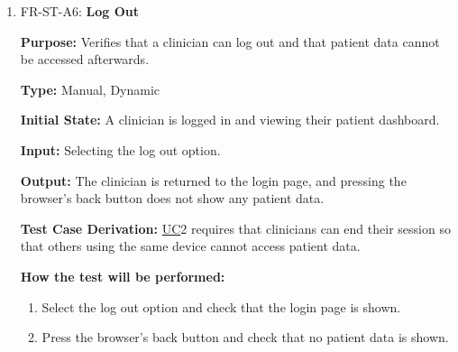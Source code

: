 \documentclass[12pt, titlepage]{article}
\newcommand{\srsuc}[1]{\href{https://github.com/Nour-Fawaz/MacaBoca/blob/main/pdfs/SRS/SRS.pdf}{UC}}
\renewcommand{\_}{\oldunderscore\allowbreak}
\begin{document}
\begin{enumerate}
  \item FR-ST-A6: \textbf{Log Out\\}
  \begin{mdframed}[linewidth=0.5mm]
      \textbf{Purpose:} Verifies that a clinician can log out and that patient data cannot be accessed afterwards. \par
      \textbf{Type:} Manual, Dynamic \par
      \textbf{Initial State:} A clinician is logged in and viewing their patient dashboard. \par
      \textbf{Input:} Selecting the log out option. \par
      \textbf{Output:} The clinician is returned to the login page, and pressing the browser's back button does not show any patient data. \par
      \textbf{Test Case Derivation:} \srsuc*{2} requires that clinicians can end their session so that others using the same device cannot access patient data. \par
      \textbf{How the test will be performed:}
      \begin{enumerate}
          \item[1.] Select the log out option and check that the login page is shown.
          \item[2.] Press the browser's back button and check that no patient data is shown.
      \end{enumerate}
  \end{mdframed}
\end{enumerate}
\end{document}
